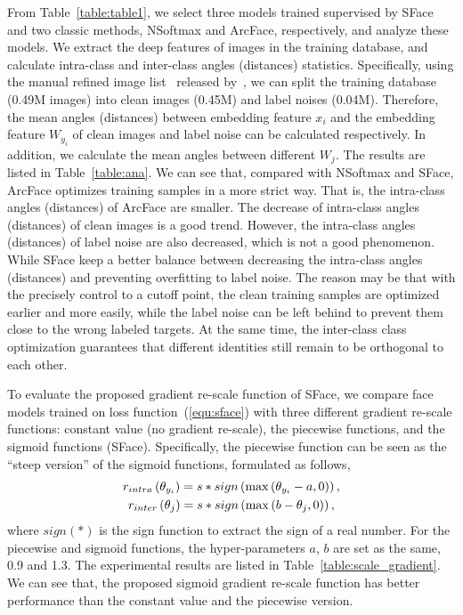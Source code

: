 \documentclass[journal,comsoc]{IEEEtran}
\begin{document}
From Table~\ref{table:table1}, we select three models trained supervised by SFace and two classic methods, NSoftmax and ArcFace, respectively, and analyze these models. We extract the deep features of images in the training database, and calculate intra-class and inter-class angles (distances) statistics. Specifically, using the manual refined image list~\cite{rwebface_wang} released by~\cite{wang2017normface}, we can split the training database (0.49M images) into clean images (0.45M) and label noises (0.04M). Therefore, the mean angles (distances) between embedding feature $x_i$ and the embedding feature $W_{y_i}$ of clean images and label noise can be calculated respectively. In addition, we calculate the mean angles between different $W_j$. The results are listed in Table~\ref{table:ana}. We can see that, compared with NSoftmax and SFace, ArcFace optimizes training samples in a more strict way. That is, the intra-class angles (distances) of ArcFace are smaller. The decrease of intra-class angles (distances) of clean images is a good trend. However, the intra-class angles (distances) of label noise are also decreased, which is not a good phenomenon. While SFace keep a better balance between decreasing the intra-class angles (distances) and preventing overfitting to label noise. The reason may be that with the precisely control to a cutoff point, the clean training samples are optimized earlier and more easily, while the label noise can be left behind to prevent them close to the wrong labeled targets. At the same time, the inter-class class optimization guarantees that different identities still remain to be orthogonal to each other. 

To evaluate the proposed gradient re-scale function of SFace, we compare face models trained on loss function~(\ref{equ:sface}) with three different gradient re-scale functions: constant value (no gradient re-scale), the piecewise functions, and the sigmoid functions (SFace). Specifically, the piecewise function can be seen as the ``steep version'' of the sigmoid functions, formulated as follows, 
\begin{equation}
\begin{gathered}
{r_{intra}}\left( {{\theta_{{y_i}}}} \right) = s*sign\left( \max \left( \theta _{y_i}-a,0 \right) \right)  , \hfill \\
{r_{inter}}\left( {{\theta _j}} \right) =s*sign\left( \max \left( b-\theta _j,0 \right) \right),
\end{gathered}
\end{equation}where $sign(*)$ is the sign function to extract the sign of a real number. For the piecewise and sigmoid functions, the hyper-parameters $a$, $b$ are set as the same, 0.9 and 1.3. The experimental results are listed in Table~\ref{table:scale_gradient}. We can see that, the proposed sigmoid gradient re-scale function has better performance than the constant value and the piecewise version. 
\end{document}
